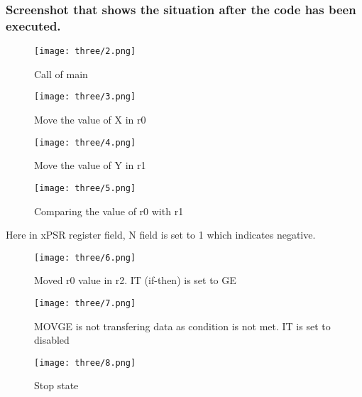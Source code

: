 \documentclass[a4paper,12pt]{article}
\begin{document}
\subsubsection{Screenshot that shows the situation after the code has been executed.}
\begin{figure}[H]
    \centering
    \texttt{[image: three/2.png]}
    \caption{Call of main}
\end{figure}
\begin{figure}[H]
    \centering
    \texttt{[image: three/3.png]}
    \caption{Move the value of X in r0}
\end{figure}
\begin{figure}[H]
    \centering
    \texttt{[image: three/4.png]}
    \caption{Move the value of Y in r1}
\end{figure}
\begin{figure}[H]
    \centering
    \texttt{[image: three/5.png]}
    \caption{Comparing the value of r0 with r1}
\end{figure}
Here in xPSR register field, N field is set to 1 which indicates negative.
\begin{figure}[H]
    \centering
    \texttt{[image: three/6.png]}
    \caption{Moved r0 value in r2. IT (if-then) is set to GE}
\end{figure}
\begin{figure}[H]
    \centering
    \texttt{[image: three/7.png]}
    \caption{MOVGE is not transfering data as condition is not met. IT is set to disabled}
\end{figure}
\begin{figure}[H]
    \centering
    \texttt{[image: three/8.png]}
    \caption{Stop state}
\end{figure}
\end{document}
